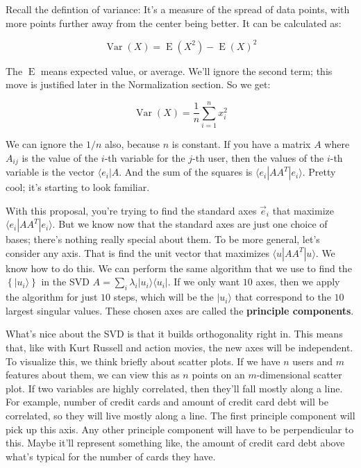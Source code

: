 \documentclass{amsbook}
\begin{document}
Recall the defintion of variance:  It's a measure of the spread of data points, with more points further away from the center being better.  It can be calculated as:

\begin{equation}
\label{var}
\operatorname{Var}(X) = \operatorname{E}(X^2) - \operatorname{E}(X)^2
\end{equation}

The $\operatorname{E}$ means expected value, or average.  We'll ignore the second term; this move is justified later in the Normalization section.  So we get:

$$
\operatorname{Var}(X) = \frac{1}{n}\sum_{i=1}^n x_i^2
$$

We can ignore the $1/n$ also, because $n$ is constant.  If you have a matrix $A$ where $A_{ij}$ is the value of the $i$-th variable for the $j$-th user, then the values of the $i$-th variable is the vector $\langle e_i|A$.  And the sum of the squares is $\langle e_i|AA^T|e_i\rangle$.  Pretty cool; it's starting to look familiar.

With this proposal, you're trying to find the standard axes $\vec e_i$ that maximize $\langle e_i|AA^T|e_i\rangle$.  But we know now that the standard axes are just one choice of bases; there's nothing really special about them.  To be more general, let's consider any axis.  That is find the unit vector that maximizes $\langle u|AA^T|u\rangle$.  We know how to do this.  We can perform the same algorithm that we use to find the $\left\{|u_i\rangle\right\}$ in the SVD $A=\sum_i\lambda_i|u_i\rangle\langle u_i|$.  If we only want $10$ axes, then we apply the algorithm for just $10$ steps, which will be the $|u_i\rangle$ that correspond to the $10$ largest singular values.  These chosen axes are called the {\bf principle components}.

What's nice about the SVD is that it builds orthogonality right in.  This means that, like with Kurt Russell and action movies, the new axes will be independent.  To visualize this, we think briefly about scatter plots.  If we have $n$ users and $m$ features about them, we can view this as $n$ points on an $m$-dimensional scatter plot.  If two variables are highly correlated, then they'll fall mostly along a line.  For example, number of credit cards and amount of credit card debt will be correlated, so they will live mostly along a line.  The first principle component will pick up this axis.  Any other principle component will have to be perpendicular to this.  Maybe it'll represent something like, the amount of credit card debt above what's typical for the number of cards they have.
\end{document}
